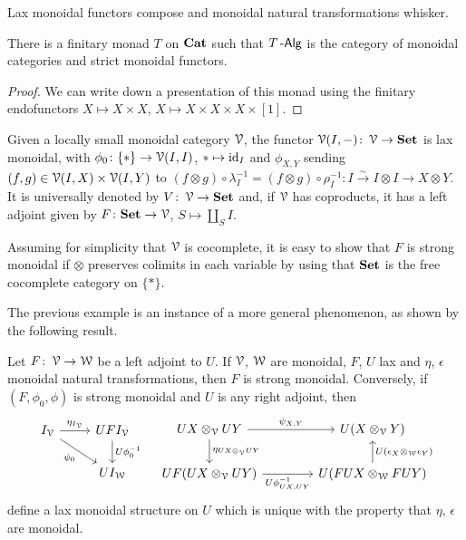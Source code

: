 \documentclass[a4paper,11pt,oneside,openany]{scrbook}
\begin{document}
\begin{prop}
	Lax monoidal functors compose and monoidal natural transformations whisker.
\end{prop}

\begin{prop}
	There is a finitary monad $T$ on ${\normalfont\textbf{Cat}}$ such that $T\operatorname{-\mathsf{Alg}}$ is the category of monoidal categories and strict monoidal functors.
\end{prop}

\begin{proof}
	We can write down a presentation of this monad using the finitary endofunctors $X\mapsto X\times X$, $X\mapsto X\times X\times X\times [1]$.
\end{proof}

\begin{exmp}
	Given a locally small monoidal category $\operatorname{\mathcal{V}}$, the functor $\operatorname{\mathcal{V}}(I,-)\colon\operatorname{\mathcal{V}}\rightarrow{\normalfont\textbf{Set}}$ is lax monoidal, with $\phi_0\colon\{*\}\rightarrow\operatorname{\mathcal{V}}(I,I)$, $*\mapsto\operatorname{id}_{I}$ and $\phi_{X,Y}$ sending $(f,g)\in\operatorname{\mathcal{V}}(I,X)\times\operatorname{\mathcal{V}}(I,Y)$ to $(f\otimes g)\circ\lambda_I^{-1}=(f\otimes g)\circ\rho_I^{-1}\colon I\xrightarrow{\sim} I\otimes I\rightarrow X\otimes Y$. It is universally denoted by $V\colon\operatorname{\mathcal{V}}\rightarrow{\normalfont\textbf{Set}}$ and, if $\operatorname{\mathcal{V}}$ has coproducts, it has a left adjoint given by $F\colon{\normalfont\textbf{Set}}\rightarrow\operatorname{\mathcal{V}}$, $S\mapsto\amalg_S I$.

	Assuming for simplicity that $\operatorname{\mathcal{V}}$ is cocomplete, it is easy to show that $F$ is strong monoidal if $\otimes$ preserves colimits in each variable by using that ${\normalfont\textbf{Set}}$ is the free cocomplete category on $\{*\}$.
\end{exmp}

The previous example is an instance of a more general phenomenon, as shown by the following result.

\begin{thm}
	Let $F\colon\operatorname{\mathcal{V}}\rightarrow\operatorname{\mathcal{W}}$ be a left adjoint to $U$. If $\operatorname{\mathcal{V}}$, $\operatorname{\mathcal{W}}$ are monoidal, $F$, $U$ lax and $\eta$, $\epsilon$ monoidal natural transformations, then $F$ is strong monoidal. Conversely, if $(F,\phi_0,\phi)$ is strong monoidal and $U$ is any right adjoint, then
	\[
		\begin{tikzcd}
			I_{\V}\ar[r, "\eta_{I_{\V}}"]\ar[dr, "\psi_0", swap]
			& UFI_{\V}\ar[d, "U\phi_0^{-1}"] \\
			& UI_{\W}
		\end{tikzcd}
		\quad
        \begin{tikzcd}[column sep=4em]
            UX\otimes_{\V}UY\ar[r, "\psi_{X,Y}"]\ar[d, "\eta_{UX\otimes_{\V}UY}"]
			& U(X\otimes_{\V}Y) \\
			UF(UX\otimes_{\V}UY)\ar[r, "U\phi^{-1}_{UX,UY}", swap]
            & U(FUX\otimes_{\W}FUY)\ar[u,"U(\epsilon_X\otimes_{\W}\epsilon_Y)", swap]
		\end{tikzcd}
	\]
	define a lax monoidal structure on $U$ which is unique with the property that $\eta$, $\epsilon$ are monoidal.
\end{thm}
\end{document}
